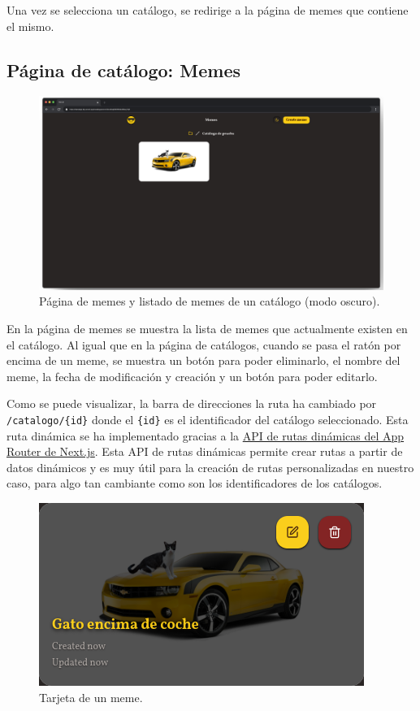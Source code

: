 Una vez se selecciona un catálogo, se redirige a la página de memes que contiene el mismo.

\subsection{Página de catálogo: Memes}

\begin{figure}[H]
    \caption{Página de memes y listado de memes de un catálogo (modo oscuro).}
    \centering
    \vspace*{0.5cm}
    \includegraphics[scale=0.3]{figuras/memes.png}
\end{figure}

En la página de memes se muestra la lista de memes que actualmente existen en el catálogo. Al igual que en la página de catálogos, cuando se pasa el ratón por encima de un meme, se muestra un botón para poder eliminarlo, el nombre del meme, la fecha de modificación y creación y un botón para poder editarlo.

Como se puede visualizar, la barra de direcciones la ruta ha cambiado por \texttt{/catalogo/\{id\}} donde el \texttt{\{id\}} es el identificador del catálogo seleccionado. Esta ruta dinámica se ha implementado gracias a la \href{https://nextjs.org/docs/app/building-your-application/routing/dynamic-routes}{API de rutas dinámicas del App Router de Next.js}. Esta API de rutas dinámicas permite crear rutas a partir de datos dinámicos y es muy útil para la creación de rutas personalizadas en nuestro caso, para algo tan cambiante como son los identificadores de los catálogos.

\begin{figure}[H]
    \caption{Tarjeta de un meme.}
    \centering
    \vspace*{0.5cm}
    \includegraphics[scale=0.3]{figuras/meme_gato.png}
\end{figure}

